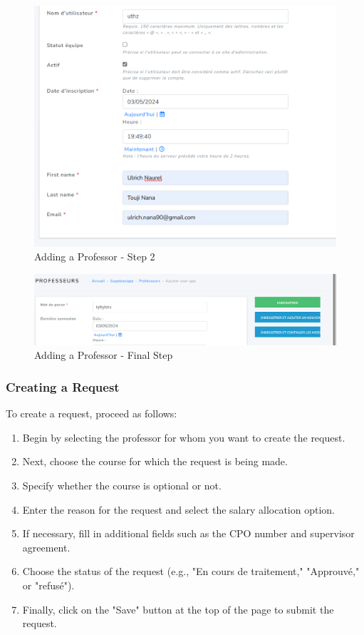 \documentclass[12pt]{article}
\begin{document}
\begin{figure}[H]
    \centering
    \includegraphics[width=0.75\linewidth]{image41.png}
    \caption{Adding a Professor - Step 2}
\end{figure}

\begin{figure}[H]
    \centering
    \includegraphics[width=0.75\linewidth]{image42.png}
    \caption{Adding a Professor - Final Step}
\end{figure}

\subsubsection{Creating a Request}\label{12}

To create a request, proceed as follows:

\begin{enumerate}
    \item Begin by selecting the professor for whom you want to create the request.
    \item Next, choose the course for which the request is being made.
    \item Specify whether the course is optional or not.
    \item Enter the reason for the request and select the salary allocation option.
    \item If necessary, fill in additional fields such as the CPO number and supervisor agreement.
    \item Choose the status of the request (e.g., "En cours de traitement," "Approuvé," or "refusé").
    \item Finally, click on the "Save" button at the top of the page to submit the request.
\end{enumerate}
\end{document}
